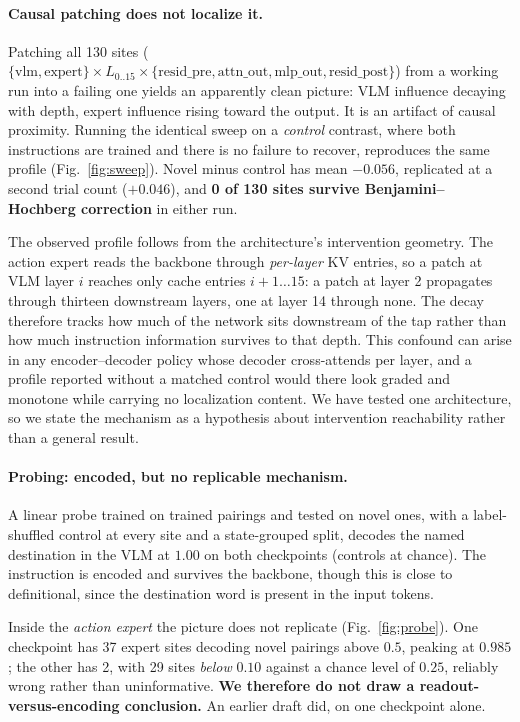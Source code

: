 \documentclass{article}
\begin{document}
\paragraph{Causal patching does not localize it.} Patching all 130 sites
($\{\textrm{vlm},\textrm{expert}\}\times L_{0..15}\times\{\textrm{resid\_pre},
\textrm{attn\_out},\textrm{mlp\_out},\textrm{resid\_post}\}$) from a working run into a failing
one yields an apparently clean picture: VLM influence decaying with depth, expert influence
rising toward the output. It is an artifact of causal proximity. Running the identical sweep on a
\emph{control} contrast, where both instructions are trained and there is no failure to recover, reproduces the same
profile (Fig.~\ref{fig:sweep}). Novel minus control has mean $-0.056$, replicated at a second
trial count ($+0.046$), and \textbf{0 of 130 sites survive Benjamini--Hochberg correction} in
either run.

The observed profile follows from the architecture's intervention geometry. The action expert
reads the backbone through \emph{per-layer} KV entries, so a patch at VLM layer $i$ reaches
only cache entries $i{+}1 \ldots 15$: a patch at layer 2 propagates through thirteen downstream
layers, one at layer 14 through none. The decay therefore tracks how much of the network sits
downstream of the tap rather than how much instruction information survives to that depth. This
confound can arise in any encoder--decoder policy whose decoder cross-attends per layer, and a
profile reported without a matched control would there look graded and monotone while carrying
no localization content. We have tested one architecture, so we state the mechanism as a
hypothesis about intervention reachability rather than a general result.

\paragraph{Probing: encoded, but no replicable mechanism.} A linear probe trained on trained
pairings and tested on novel ones, with a label-shuffled control at every site and a
state-grouped split, decodes the named destination in the VLM at $1.00$ on both checkpoints
(controls at chance). The instruction is encoded and survives the backbone, though this is
close to definitional, since the destination word is present in the input tokens.

Inside the \emph{action expert} the picture does not replicate (Fig.~\ref{fig:probe}). One
checkpoint has 37 expert sites decoding novel pairings above $0.5$, peaking at $0.985$; the
other has 2, with 29 sites \emph{below} $0.10$ against a chance level of $0.25$, reliably
wrong rather than uninformative. \textbf{We therefore do not draw a readout-versus-encoding
conclusion.} An earlier draft did, on one checkpoint alone.
\end{document}
